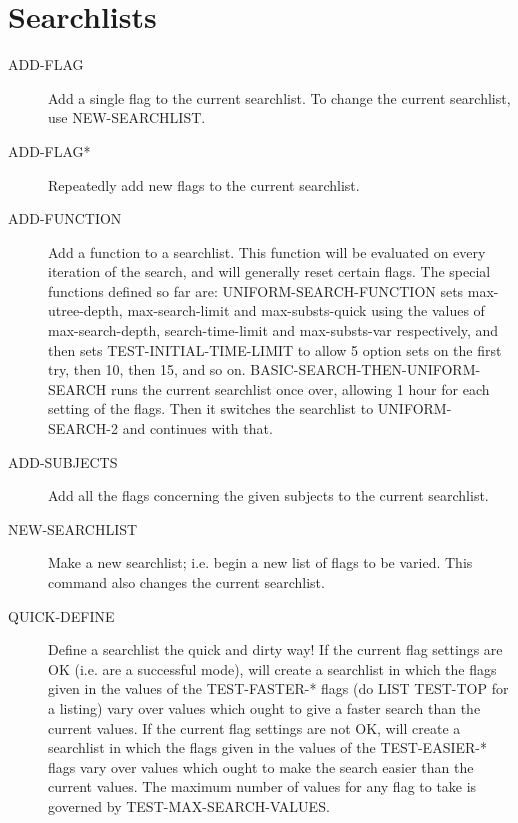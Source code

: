 \section{Searchlists}

\begin{description} 
\item[ADD-FLAG]  
Add a single flag to the current searchlist.
To change the current searchlist, use NEW-SEARCHLIST.

\item[ADD-FLAG*]  
Repeatedly add new flags to the current searchlist.

\item[ADD-FUNCTION]  
Add a function to a searchlist. This function will be evaluated on 
every iteration of the search, and will generally reset certain flags.
The special functions defined so far are:
UNIFORM-SEARCH-FUNCTION sets max-utree-depth, max-search-limit and max-substs-quick
using the values of max-search-depth, search-time-limit and max-substs-var respectively,
and then sets TEST-INITIAL-TIME-LIMIT to allow 5 option sets on the first try, then
10, then 15, and so on.
BASIC-SEARCH-THEN-UNIFORM-SEARCH runs the current searchlist once over, allowing
1 hour for each setting of the flags. Then it switches the searchlist to
UNIFORM-SEARCH-2 and continues with that.

\item[ADD-SUBJECTS]  
Add all the flags concerning the given subjects to the current 
searchlist.

\item[NEW-SEARCHLIST]  
Make a new searchlist; i.e. begin a new list of flags to be varied.
This command also changes the current searchlist.

\item[QUICK-DEFINE]  
Define a searchlist the quick and dirty way!
If the current flag settings are OK (i.e. are a successful mode),
will create a searchlist in which the flags given in the values of 
the TEST-FASTER-* flags (do LIST TEST-TOP for a listing) vary over 
values which ought to give a faster search than the current values.
If the current flag settings are not OK, will create a searchlist in 
which the flags given in the values of the TEST-EASIER-* flags vary
over values which ought to make the search easier than the current 
values.
The maximum number of values for any flag to take is governed 
by TEST-MAX-SEARCH-VALUES.


\end{description}
